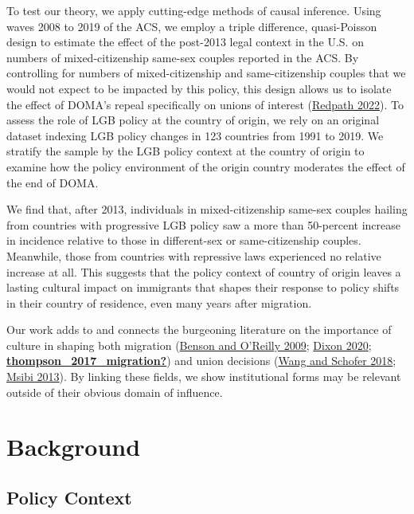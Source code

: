 \documentclass[
  12pt,
]{article}
\begin{document}
To test our theory, we apply cutting-edge methods of causal inference. Using waves 2008 to 2019 of the ACS, we employ a triple difference, quasi-Poisson design to estimate the effect of the post-2013 legal context in the U.S. on numbers of mixed-citizenship same-sex couples reported in the ACS. By controlling for numbers of mixed-citizenship and same-citizenship couples that we would not expect to be impacted by this policy, this design allows us to isolate the effect of DOMA's repeal specifically on unions of interest (\protect\hyperlink{ref-redpath_2022_spousal}{Redpath 2022}). To assess the role of LGB policy at the country of origin, we rely on an original dataset indexing LGB policy changes in 123 countries from 1991 to 2019. We stratify the sample by the LGB policy context at the country of origin to examine how the policy environment of the origin country moderates the effect of the end of DOMA.

We find that, after 2013, individuals in mixed-citizenship same-sex couples hailing from countries with progressive LGB policy saw a more than 50-percent increase in incidence relative to those in different-sex or same-citizenship couples. Meanwhile, those from countries with repressive laws experienced no relative increase at all. This suggests that the policy context of country of origin leaves a lasting cultural impact on immigrants that shapes their response to policy shifts in their country of residence, even many years after migration.

Our work adds to and connects the burgeoning literature on the importance of culture in shaping both migration (\protect\hyperlink{ref-benson_2009}{Benson and O'Reilly 2009}; \protect\hyperlink{ref-dixon_2020}{Dixon 2020}; \protect\hyperlink{ref-thompson_2017_migration}{\textbf{thompson\_2017\_migration?}}) and union decisions (\protect\hyperlink{ref-wang_2018_coming}{Wang and Schofer 2018}; \protect\hyperlink{ref-msibi_2013_denied}{Msibi 2013}). By linking these fields, we show institutional forms may be relevant outside of their obvious domain of influence.

\hypertarget{background}{%
\section{Background}\label{background}}

\hypertarget{policy-context}{%
\subsection{Policy Context}\label{policy-context}}
\end{document}
